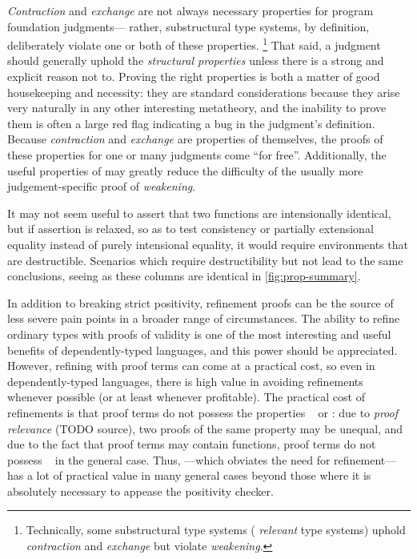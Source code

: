 \emph{Contraction} and \emph{exchange} are not always necessary properties for program foundation judgments---%
rather, substructural type systems, by definition, deliberately violate one or both of these properties.%
\footnote{\hspace{0.01in}Technically, some substructural type systems (\eg{} \emph{relevant} type systems) uphold \emph{contraction} and \emph{exchange} but violate \emph{weakening}.}
That said, a judgment should generally uphold the \emph{structural properties} unless there is a strong and explicit
reason not to. Proving the right properties
is both a matter of good housekeeping and necessity: they are standard
considerations because they arise very naturally in any other
interesting metatheory, and the inability to prove them is often a large red flag indicating a bug in the judgment's definition.
Because \emph{contraction} and \emph{exchange} are properties of \dds{} themselves,
the proofs of these properties for one or many judgments come ``for free''.
Additionally, the useful properties of \dds{} may greatly reduce the difficulty of the usually
more judgement-specific proof of \emph{weakening}.

It may not seem useful to assert that two functions are intensionally identical, but if assertion is relaxed,
so as to test consistency or partially extensional equality instead of purely intensional equality,
it would require environments that are destructible.
Scenarios which require destructibility but not \EqDec{} lead to the same conclusions,
seeing as these columns are identical in \autoref{fig:prop-summary}.

In addition to breaking strict positivity, refinement proofs can be the source of less severe pain points in
a broader range of circumstances.
The ability to refine ordinary types with proofs of validity is one of the most interesting and useful benefits of
dependently-typed languages, and this power should be appreciated. However, refining with proof terms can
come at a practical cost, so even in dependently-typed languages, there is high value in avoiding refinements
whenever possible (or at least whenever profitable). The practical cost of refinements is that proof terms
do not possess the properties \SemInj~ or \EqDec: due to \emph{proof relevance} (TODO source), two proofs of
the same property may be unequal, and due to the fact that proof terms may contain functions, proof terms do not
possess \EqDec~ in the general case. Thus, \SemTot---which obviates the need for refinement---has
a lot of practical value in many general cases beyond those where it is absolutely necessary to appease the
positivity checker.


